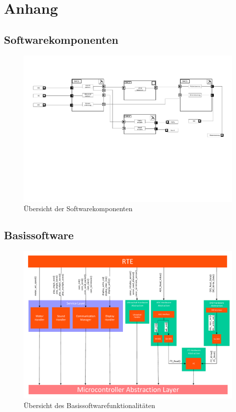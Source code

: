 \appendix
\chapter{Anhang}


\section{Softwarekomponenten}
\begin{figure}[h]
\includegraphics[width=\textwidth]{Dokumente/ComponentDiagram.pdf}
\caption{Übersicht der Softwarekomponenten}
\label{pic:Softwarekompo}
\end{figure}


\section{Basissoftware}
\begin{figure}[h]
\includegraphics[width=\textwidth]{Dokumente/Schichtenmodel.pdf}
\caption{Übersicht des Basissoftwarefunktionalitäten}
\label{pic:Basissoftware}
\end{figure}

